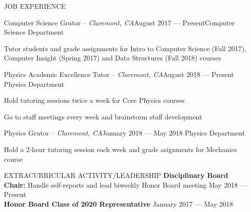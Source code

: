 \documentclass{resume} %
\begin{document}
\begin{rSection}{JOB EXPERIENCE}
\begin{rSubsection}{Computer Science Grutor -- {\it Claremont, CA}}{August 2017 --- Present}{Computer Science Department}

\item Tutor students and grade assignments for Intro to Computer Science (Fall 2017), Computer Insight (Spring 2017) and Data Structures (Fall 2018) courses
\end{rSubsection}

\begin{rSubsection}{Physics Academic Excellence Tutor -- {\it Claremont, CA}}{August 2018 --- Present}
{Physics Department}

\item Hold tutoring sessions twice a week for Core Physics courses
\item Go to staff meetings every week and brainstorm staff development
\end{rSubsection}
\begin{rSubsection}{Physics Grutor -- {\it Claremont, CA}}{January 2018 --- May 2018}
{Physics Department}

\item Hold a 2-hour tutoring session each week and grade asignments for Mechanics course
\end{rSubsection}
\end{rSection}
\begin{rSection}{EXTRACURRICULAR ACTIVITY/LEADERSHIP}
\textbf{Disciplinary Board Chair:} Handle self-reports and lead biweekly Honor Board meeting \hfill {May 2018 ---Present}\\
\textbf{Honor Board Class of 2020 Representative} \hfill {January 2017 --- May 2018}
\end{rSection}

\end{document}
